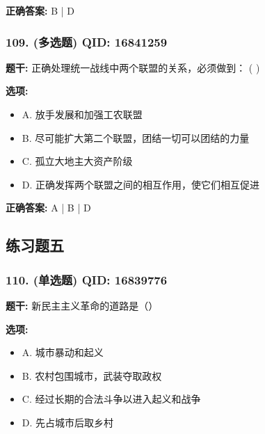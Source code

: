 \documentclass[12pt,UTF8]{ctexart}
\begin{document}
\textbf{正确答案:}
B | D

\vspace{0.3em}\hrulefill\vspace{0.7em}

\subsubsection*{109. (多选题) \small QID: 16841259}

\textbf{题干:}
正确处理统一战线中两个联盟的关系，必须做到： ( )

\textbf{选项:}
\begin{itemize}[leftmargin=*]

  \item A. 放手发展和加强工农联盟

  \item B. 尽可能扩大第二个联盟，团结一切可以团结的力量

  \item C. 孤立大地主大资产阶级

  \item D. 正确发挥两个联盟之间的相互作用，使它们相互促进

\end{itemize}

\textbf{正确答案:}
A | B | D

\vspace{0.3em}\hrulefill\vspace{0.7em}

\subsection*{练习题五}

\subsubsection*{110. (单选题) \small QID: 16839776}

\textbf{题干:}
新民主主义革命的道路是（）

\textbf{选项:}
\begin{itemize}[leftmargin=*]

  \item A. 城市暴动和起义

  \item B. 农村包围城市，武装夺取政权

  \item C. 经过长期的合法斗争以进入起义和战争

  \item D. 先占城市后取乡村

\end{itemize}
\end{document}
